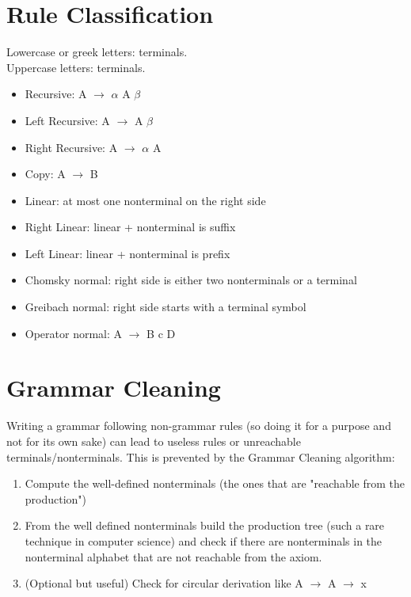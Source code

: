 \documentclass[10pt,a4paper]{article}
\begin{document}
		\section{Rule Classification}
		    Lowercase or greek letters: terminals.\\
		    Uppercase letters: terminals.
		    \begin{itemize}
		        \item Recursive: A $\rightarrow$ $\alpha$ A $\beta$ 
		        \item Left Recursive: A $\rightarrow$ A $\beta$ 
		        \item Right Recursive: A $\rightarrow$ $\alpha$ A
		        \item Copy: A $\rightarrow$ B
		        \item Linear: at most one nonterminal on the right side
		        \item Right Linear: linear + nonterminal is suffix
		        \item Left Linear: linear + nonterminal is prefix
		        \item Chomsky normal: right side is either two nonterminals or a terminal
		        \item Greibach normal: right side starts with a terminal symbol
		        \item Operator normal: A $\rightarrow$ B c D
		    \end{itemize}
	    
	    \section{Grammar Cleaning}
	        Writing a grammar following non-grammar rules (so doing it for a purpose and not for its own sake) can lead to useless rules or unreachable terminals/nonterminals. This is prevented by the Grammar Cleaning algorithm:
	            \begin{enumerate}
	                \item Compute the well-defined nonterminals (the ones that are "reachable from the production")
	                \item From the well defined nonterminals build the production tree (such a rare technique in computer science) and check if there are nonterminals in the nonterminal alphabet that are not reachable from the axiom.
	                \item (Optional but useful) Check for circular derivation like A $\rightarrow$ A $\rightarrow$ x
	            \end{enumerate}
        
\end{document}

